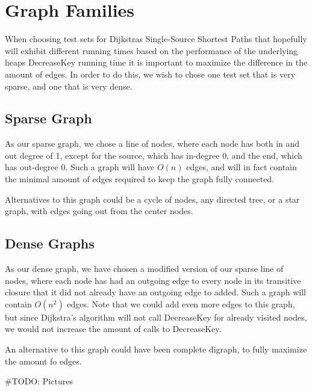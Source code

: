 \section{Graph Families}

When choosing test sets for Dijkstras Single-Source Shortest Paths that hopefully will exhibit different running times based on the performance of the underlying heaps DecreaseKey running time it is important to maximize the difference in the amount of edges.
In order to do this, we wish to chose one test set that is very sparse, and one that is very dense.

\subsection{Sparse Graph}

As our sparse graph, we chose a line of nodes, where each node has both in and out degree of 1, except for the source, which has in-degree 0, and the end, which has out-degree 0. Such a graph will have $O(n)$ edges, and will in fact contain the minimal amount of edges required to keep the graph fully connected.

Alternatives to this graph could be a cycle of nodes, any directed tree, or a star graph, with edges going out from the center nodes.

\subsection{Dense Graphs}

As our dense graph, we have chosen a modified version of our sparse line of nodes, where each node has had an outgoing edge to every node in its transitive closure that it did not already have an outgoing edge to added. Such a graph will contain $O(n^2)$ edges. Note that we could add even more edges to this graph, but since Dijkstra's algorithm will not call DecreaseKey for already visited nodes, we would not increase the amount of calls to DecreaseKey.

An alternative to this graph could have been complete digraph, to fully maximize the amount fo edges.

#TODO: Pictures